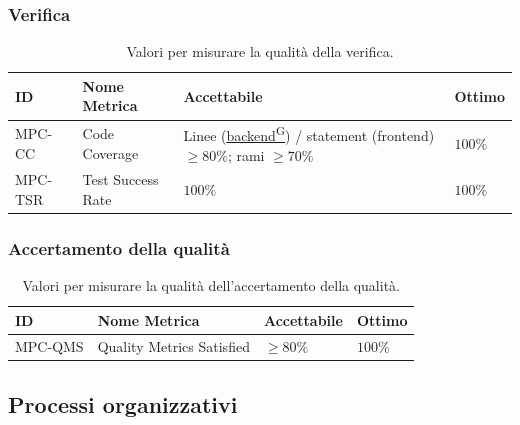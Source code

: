 \documentclass[a4paper,12pt]{article}
\providecommand{\glslink}[2]{\href{https://alittlebyte-19.github.io/Documentazione/glossario.html\#gls-#1}{\underline{#2}\textsuperscript{\scriptsize G}}}
\begin{document}
\subsubsection{Verifica}
\begin{table}[H]
    \centering
    \renewcommand{\arraystretch}{1.2}
    \begin{tabularx}{\textwidth}{|p{2.4cm}|X|p{3cm}|p{3cm}|}
        \hline
        \rowcolor{gray!20}
        \textbf{ID} & \textbf{Nome Metrica} & \textbf{Accettabile} & \textbf{Ottimo} \\
        \hline
        MPC-CC & Code Coverage & Linee (\glslink{backend}{backend}) / statement (frontend) $\geq 80\%$; rami $\geq 70\%$ & $100\%$ \\
        MPC-TSR & Test Success Rate & $100\%$ & $100\%$ \\
        \hline
    \end{tabularx}
    \caption{Valori per misurare la qualità della verifica.}
\end{table}

\subsubsection{Accertamento della qualità}
\begin{table}[H]
    \centering
    \renewcommand{\arraystretch}{1.2}
    \begin{tabularx}{\textwidth}{|p{2.4cm}|X|p{3cm}|p{3cm}|}
        \hline
        \rowcolor{gray!20}
        \textbf{ID} & \textbf{Nome Metrica} & \textbf{Accettabile} & \textbf{Ottimo} \\
        \hline
        MPC-QMS & Quality Metrics Satisfied & $\geq 80\%$ & $100\%$ \\
        \hline
    \end{tabularx}
    \caption{Valori per misurare la qualità dell'accertamento della qualità.}
\end{table}

\subsection{Processi organizzativi}
\end{document}
